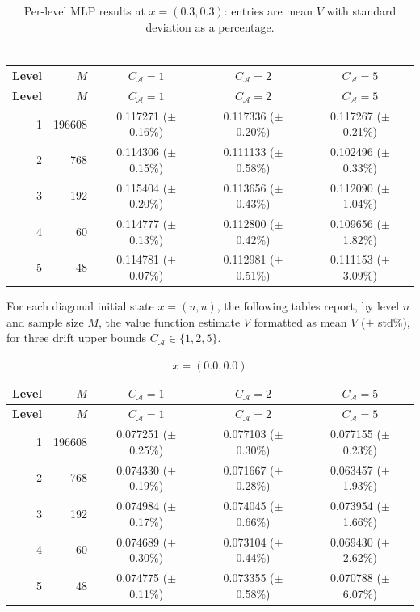 \documentclass[11pt]{article}
\theoremstyle{definition}
\theoremstyle{plain}
\begin{document}
\begin{appendices}
\begin{longtable}{@{}r r c c c@{}}
\caption{Per-level MLP results at $x=(0.3,0.3)$: entries are mean $V$ with standard deviation as a percentage.}\label{tab:summary-03}\ \\
\toprule
\textbf{Level} & \textbf{$M$} & \textbf{$C_{\mathcal A}=1$} & \textbf{$C_{\mathcal A}=2$} & \textbf{$C_{\mathcal A}=5$} \\
\midrule
\endfirsthead
\toprule
\textbf{Level} & \textbf{$M$} & \textbf{$C_{\mathcal A}=1$} & \textbf{$C_{\mathcal A}=2$} & \textbf{$C_{\mathcal A}=5$} \\
\midrule
\endhead
1 & 196608 & 0.117271 (\(\pm\) 0.16\%) & 0.117336 (\(\pm\) 0.20\%) & 0.117267 (\(\pm\) 0.21\%) \\
2 & 768    & 0.114306 (\(\pm\) 0.15\%) & 0.111133 (\(\pm\) 0.58\%) & 0.102496 (\(\pm\) 0.33\%) \\
3 & 192    & 0.115404 (\(\pm\) 0.20\%) & 0.113656 (\(\pm\) 0.43\%) & 0.112090 (\(\pm\) 1.04\%) \\
4 & 60     & 0.114777 (\(\pm\) 0.13\%) & 0.112800 (\(\pm\) 0.42\%) & 0.109656 (\(\pm\) 1.82\%) \\
5 & 48     & 0.114781 (\(\pm\) 0.07\%) & 0.112981 (\(\pm\) 0.51\%) & 0.111153 (\(\pm\) 3.09\%) \\
\bottomrule
\end{longtable}

\fi


For each diagonal initial state $x=(u,u)$, the following tables report, by level $n$ and sample size $M$, the value function estimate $V$ formatted as mean $V$ (\(\pm\) std\%), for three drift upper bounds $C_{\mathcal A}\in\{1,2,5\}$.

\begin{longtable}{@{}r r c c c@{}}
\caption{$x=(0.0,0.0)$}\label{tab:mlp-x00}\\
\toprule
\textbf{Level} & \textbf{$M$} & \textbf{$C_{\mathcal A}=1$} & \textbf{$C_{\mathcal A}=2$} & \textbf{$C_{\mathcal A}=5$} \\
\midrule
\endfirsthead
\toprule
\textbf{Level} & \textbf{$M$} & \textbf{$C_{\mathcal A}=1$} & \textbf{$C_{\mathcal A}=2$} & \textbf{$C_{\mathcal A}=5$} \\
\midrule
\endhead
1 & 196608 & 0.077251 (\(\pm\) 0.25\%) & 0.077103 (\(\pm\) 0.30\%) & 0.077155 (\(\pm\) 0.23\%) \\
2 & 768    & 0.074330 (\(\pm\) 0.19\%) & 0.071667 (\(\pm\) 0.28\%) & 0.063457 (\(\pm\) 1.93\%) \\
3 & 192    & 0.074984 (\(\pm\) 0.17\%) & 0.074045 (\(\pm\) 0.66\%) & 0.073954 (\(\pm\) 1.66\%) \\
4 & 60     & 0.074689 (\(\pm\) 0.30\%) & 0.073104 (\(\pm\) 0.44\%) & 0.069430 (\(\pm\) 2.62\%) \\
5 & 48     & 0.074775 (\(\pm\) 0.11\%) & 0.073355 (\(\pm\) 0.58\%) & 0.070788 (\(\pm\) 6.07\%) \\
\bottomrule
\end{longtable}


\end{appendices}
\end{document}
